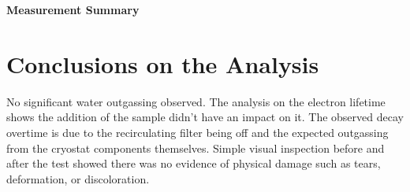 \documentclass[12pt]{article}
\begin{document}
\begin{table}[H]
    \centering
    \caption*{\textbf{Measurement Summary}}
    \renewcommand\arraystretch{1.5} %
    \renewcommand\arraystretch{1} %
    \vspace{0.3cm}
    \centering
    \caption{Summary of measurement results for each run. Systematic uncertainties are not included.}
    \vspace{0.1cm}
    \label{tab:measurement_summary}
\end{table}

\vspace{-1cm}

\section*{Conclusions on the Analysis}
No significant water outgassing observed. The analysis on the electron lifetime shows the addition of the sample didn't have an impact on it. The observed decay overtime is due to the recirculating filter being off and the expected outgassing from the cryostat components themselves. Simple visual inspection before and after the test showed there was no evidence of physical damage such as tears, deformation, or discoloration.
\end{document}

